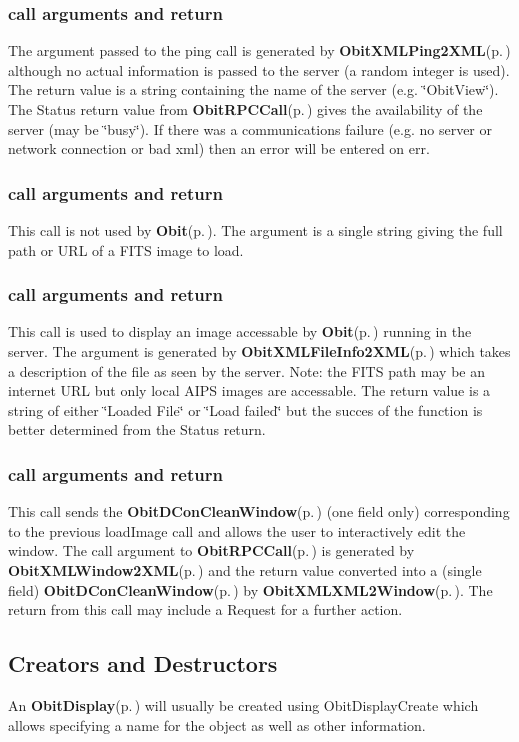 \subsubsection{call arguments and return}\label{ObitDisplay_8h_ping}
The argument passed to the ping call is generated by {\bf Obit\-XMLPing2XML}{\rm (p.\,\pageref{ObitXML_8c_a14})} although no actual information is passed to the server (a random integer is used). The return value is a string containing the name of the server (e.g. \char`\"{}Obit\-View\char`\"{}). The Status return value from {\bf Obit\-RPCCall}{\rm (p.\,\pageref{ObitRPC_8c_a11})} gives the availability of the server (may be \char`\"{}busy\char`\"{}). If there was a communications failure (e.g. no server or network connection or bad xml) then an error will be entered on err.\subsubsection{call arguments and return}\label{ObitDisplay_8h_loadFITS}
This call is not used by {\bf Obit}{\rm (p.\,\pageref{structObit})}. The argument is a single string giving the full path or URL of a FITS image to load.\subsubsection{call arguments and return}\label{ObitDisplay_8h_loadImage}
This call is used to display an image accessable by {\bf Obit}{\rm (p.\,\pageref{structObit})} running in the server. The argument is generated by {\bf Obit\-XMLFile\-Info2XML}{\rm (p.\,\pageref{ObitXML_8c_a19})} which takes a description of the file as seen by the server. Note: the FITS path may be an internet URL but only local AIPS images are accessable. The return value is a string of either \char`\"{}Loaded File\char`\"{} or \char`\"{}Load failed\char`\"{} but the succes of the function is better determined from the Status return.\subsubsection{call arguments and return}\label{ObitDisplay_8h_editWindow}
This call sends the {\bf Obit\-DCon\-Clean\-Window}{\rm (p.\,\pageref{structObitDConCleanWindow})} (one field only) corresponding to the previous load\-Image call and allows the user to interactively edit the window. The call argument to {\bf Obit\-RPCCall}{\rm (p.\,\pageref{ObitRPC_8c_a11})} is generated by {\bf Obit\-XMLWindow2XML}{\rm (p.\,\pageref{ObitXML_8c_a21})} and the return value converted into a (single field) {\bf Obit\-DCon\-Clean\-Window}{\rm (p.\,\pageref{structObitDConCleanWindow})} by {\bf Obit\-XMLXML2Window}{\rm (p.\,\pageref{ObitXML_8c_a22})}. The return from this call may include a Request for a further action.\subsection{Creators and Destructors}\label{ObitDisplay_8h_ObitDisplayaccess}
An {\bf Obit\-Display}{\rm (p.\,\pageref{structObitDisplay})} will usually be created using Obit\-Display\-Create which allows specifying a name for the object as well as other information.

